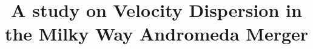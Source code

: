 \documentclass[linenumbers,trackchanges]{aastex7}
\begin{document}
\title{A study on Velocity Dispersion in the Milky Way Andromeda Merger}

\end{document}
